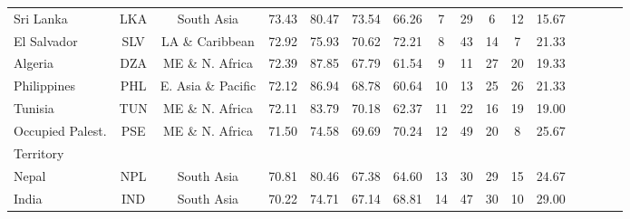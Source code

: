 \begin{longtable}[H]{lccccccccccccccc}
Sri Lanka                         & LKA           & South Asia         & 73.43       & 80.47            & 73.54                     & 66.26           & 7              & 29                  & 6                            & 12                 & 15.67                  \\
El Salvador                       & SLV           & LA \& Caribbean    & 72.92       & 75.93            & 70.62                     & 72.21           & 8              & 43                  & 14                           & 7                  & 21.33                  \\
Algeria                           & DZA           & ME \& N. Africa    & 72.39       & 87.85            & 67.79                     & 61.54           & 9              & 11                  & 27                           & 20                 & 19.33                  \\
Philippines                       & PHL           & E. Asia \& Pacific & 72.12       & 86.94            & 68.78                     & 60.64           & 10             & 13                  & 25                           & 26                 & 21.33                  \\
Tunisia                           & TUN           & ME \& N. Africa    & 72.11       & 83.79            & 70.18                     & 62.37           & 11             & 22                  & 16                           & 19                 & 19.00                  \\
Occupied Palest.    & \multirow{2}{*}{PSE}           & \multirow{2}{*}{ME \& N. Africa}    & \multirow{2}{*}{71.50}       & \multirow{2}{*}{74.58}            & \multirow{2}{*}{69.69}                     & \multirow{2}{*}{70.24}           & \multirow{2}{*}{12}             & \multirow{2}{*}{49}                  & \multirow{2}{*}{20}                           & \multirow{2}{*}{8}                  & \multirow{2}{*}{25.67}                  \\
Territory \\
Nepal                             & NPL           & South Asia         & 70.81       & 80.46            & 67.38                     & 64.60           & 13             & 30                  & 29                           & 15                 & 24.67                  \\
India                             & IND           & South Asia         & 70.22       & 74.71            & 67.14                     & 68.81           & 14             & 47                  & 30                           & 10                 & 29.00                  \\

\end{longtable}
